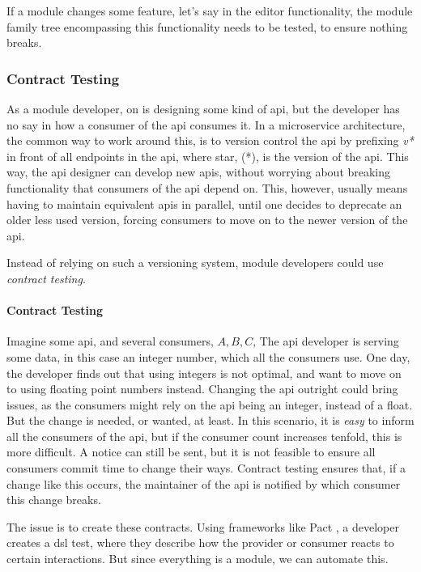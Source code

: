 If a module changes some feature, let's say in the editor functionality, the
module family tree encompassing this functionality needs to be tested, to ensure
nothing breaks.

\subsubsection{Contract Testing}

As a module developer, on is designing some kind of \gls{api}, but the developer
has no say in how a consumer of the \gls{api} consumes it. In a microservice
architecture, the common way to work around this, is to version control the
\gls{api} by prefixing \textit{v*} in front of all endpoints in the \gls{api},
where star, (*), is the version of the \gls{api}. This way, the \gls{api}
designer can develop new \gls{api}s, without worrying about breaking
functionality that consumers of the \gls{api} depend on. This, however, usually
means having to maintain equivalent \gls{api}s in parallel, until one decides
to deprecate an older less used version, forcing consumers to move on to the
newer version of the \gls{api}.

Instead of relying on such a versioning system, module developers could use
\textit{contract testing}.

\paragraph{Contract Testing} Imagine some \gls{api}, and several consumers,
$A, B, C$, The \gls{api} developer is serving some data, in this case an
integer number, which all the consumers use. One day, the developer finds out
that using integers is not optimal, and want to move on to using floating point
numbers instead. Changing the \gls{api} outright could bring issues, as the
consumers might rely on the \gls{api} being an integer, instead of a float. But
the change is needed, or wanted, at least. In this scenario, it is \textit{easy}
to inform all the consumers of the \gls{api}, but if the consumer count
increases tenfold, this is more difficult. A notice can still be sent, but it is
not feasible to ensure all consumers commit time to change their ways. Contract
testing ensures that, if a change like this occurs, the maintainer of the
\gls{api} is notified by which consumer this change breaks.

The issue is to create these contracts. Using frameworks like Pact \cite{pact},
a developer creates a \gls{dsl} test, where they describe how the provider or
consumer reacts to certain interactions. But since everything is a module, we
can automate this.

